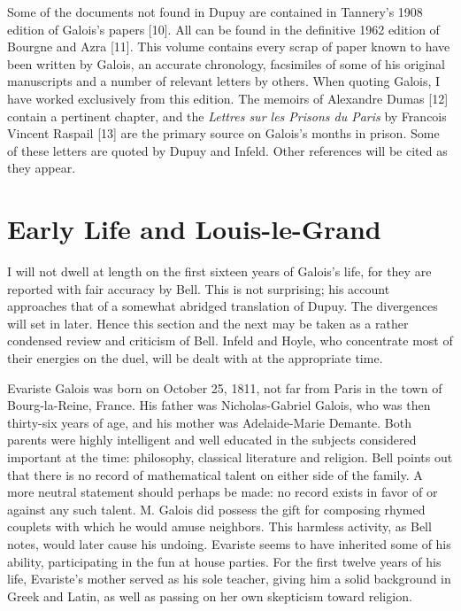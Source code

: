 \documentclass[12pt]{article}
\begin{document}
Some of the documents not found in Dupuy are contained in Tannery's 1908 edition of Galois's papers [10]. All can be found in the definitive 1962 edition of Bourgne and Azra [11]. This volume contains every scrap of paper known to have been written by Galois, an accurate chronology, facsimiles of some of his original manuscripts and a number of relevant letters by others. When quoting Galois, I have worked exclusively from this edition. The memoirs of Alexandre Dumas [12] contain a pertinent chapter, and the \emph{Lettres sur les Prisons du Paris} by Francois Vincent Raspail [13] are the primary source on Galois's months in prison. Some of these letters are quoted by Dupuy and Infeld. Other references will be cited as they appear.

\section{Early Life and Louis-le-Grand}

I will not dwell at length on the first sixteen years of Galois's life, for they are reported with fair accuracy by Bell. This is not surprising; his account approaches that of a somewhat abridged translation of Dupuy. The divergences will set in later. Hence this section and the next may be taken as a rather condensed review and criticism of Bell. Infeld and Hoyle, who concentrate most of their energies on the duel, will be dealt with at the appropriate time.

Evariste Galois was born on October 25, 1811, not far from Paris in the town of Bourg-la-Reine, France. His father was Nicholas-Gabriel Galois, who was then thirty-six years of age, and his mother was Adelaide-Marie Demante. Both parents were highly intelligent and well educated in the subjects considered important at the time: philosophy, classical literature and religion. Bell points out that there is no record of mathematical talent on either side of the family. A more neutral statement should perhaps be made: no record exists in favor of or against any such talent. M. Galois did possess the gift for composing rhymed couplets with which he would amuse neighbors. This harmless activity, as Bell notes, would later cause his undoing. Evariste seems to have inherited some of his ability, participating in the fun at house parties. For the first twelve years of his life, Evariste's mother served as his sole teacher, giving him a solid background in Greek and Latin, as well as passing on her own skepticism toward religion.
\end{document}
